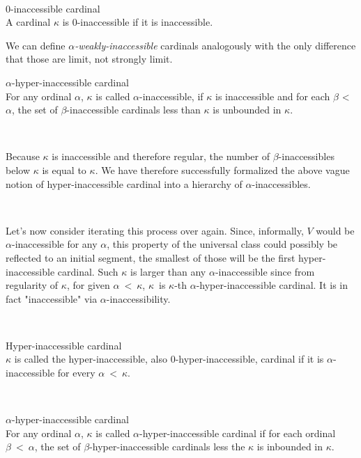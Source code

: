 \

\begin{definition}{$0$-inaccessible cardinal}\\
A cardinal $\kappa$ is $0$-inaccessible if it is inaccessible.
\end{definition}
We can define \emph{$\alpha$-weakly-inaccessible} cardinals analogously with the only difference that those are limit, not strongly limit.
\

\begin{definition}{$\alpha$-hyper-inaccessible cardinal}\label{def:alpha_inaccessible}\\
For any ordinal $\alpha$, $\kappa$ is called $\alpha$-inaccessible, if $\kappa$ is inaccessible and for each $\beta$ < $\alpha$, the set of $\beta$-inaccessible cardinals less than $\kappa$ is unbounded in $\kappa$.
\end{definition}

\

Because $\kappa$ is inaccessible and therefore regular, the number of $\beta$-inaccessibles below $\kappa$ is equal to $\kappa$. We have therefore successfully formalized the above vague notion of hyper-inaccessible cardinal into a hierarchy of $\alpha$-inaccessibles.

\

Let's now consider iterating this process over again. Since, informally, $V$ would be $\alpha$-inaccessible for any $\alpha$, this property of the universal class could possibly be reflected to an initial segment, the smallest of those will be the first hyper-inaccessible cardinal. Such $\kappa$ is larger than any $\alpha$-inaccessible since from regularity of $\kappa$, for given $\alpha\ <\ \kappa$, $\kappa$ is $\kappa$-th $\alpha$-hyper-inaccessible cardinal. It is in fact "inaccessible" via $\alpha$-inaccessibility.

\

\begin{definition}{Hyper-inaccessible cardinal}\\
$\kappa$ is called the hyper-inaccessible, also $0$-hyper-inaccessible, cardinal if it is $\alpha$-inaccessible for every $\alpha\ <\ \kappa$.
\end{definition}

\

\begin{definition}{$\alpha$-hyper-inaccessible cardinal}\\
For any ordinal $\alpha$, $\kappa$ is called $\alpha$-hyper-inaccessible cardinal if for each ordinal $\beta\ <\ \alpha$, the set of $\beta$-hyper-inaccessible cardinals less the $\kappa$ is inbounded in $\kappa$.
\end{definition}

